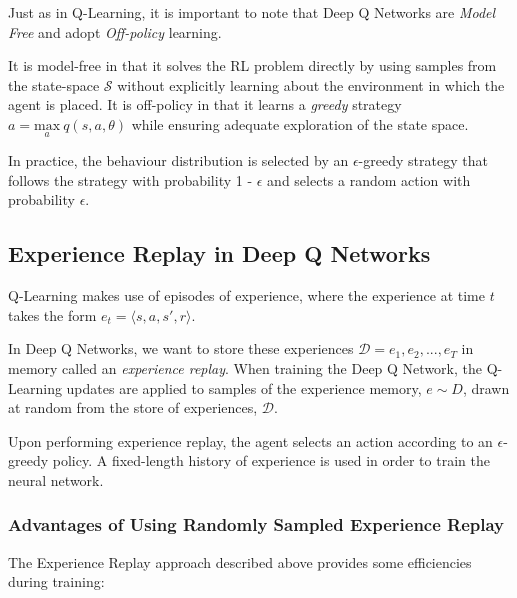 \documentclass{article}
\begin{document}
Just as in Q-Learning, it is important to note that Deep Q Networks are \textit{Model Free} and  adopt \textit{Off-policy} learning.  

It is model-free in that it solves the RL problem directly by using samples from the state-space $\mathcal{S}$ without explicitly learning about the environment in which the agent is placed. It is off-policy in that it learns a \textit{greedy} strategy $a = \underset{a}{\text{max}}\ q(s,a,\theta)$ while ensuring adequate exploration of the state space. 

In practice, the behaviour distribution is selected by an $\epsilon$-greedy strategy that follows the strategy with probability 1 - $\epsilon$ and selects a random action with probability $\epsilon$.

\subsection{Experience Replay in Deep Q Networks}

Q-Learning makes use of episodes of experience, where the experience at time $t$ takes the form $e_t = \langle s, a, s', r \rangle$. 

In Deep Q Networks, we want to store these experiences $\mathcal{D} = e_1, e_2, ..., e_T$ in memory called an \textit{experience replay}. When training the Deep Q Network, the Q-Learning updates are applied to samples of the experience memory, $e \sim D$, drawn at random from the store of experiences, $\mathcal{D}$. 

Upon performing experience replay, the agent selects an action according to an $\epsilon$-greedy policy. A fixed-length history of experience is used in order to train the neural network. 

\subsubsection{Advantages of Using Randomly Sampled Experience Replay}

The Experience Replay approach described above provides some efficiencies during training: 
\end{document}
